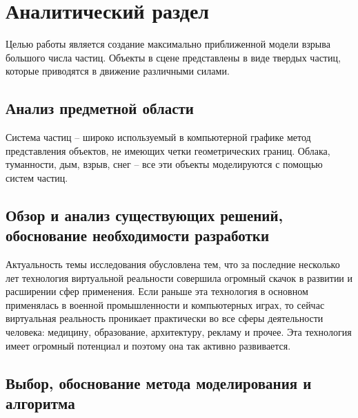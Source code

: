 \chapter{Аналитический раздел}
\hfill

Целью работы является создание максимально приближенной модели взрыва большого числа частиц. Объекты в сцене представлены в виде твердых частиц, которые приводятся в движение различными силами.  

\section{Анализ предметной области }

Система частиц – широко используемый в компьютерной графике метод представления объектов, не имеющих четки геометрических границ. Облака, туманности, дым, взрыв, снег – все эти объекты моделируются с помощью систем частиц. \cite{definition}


\section{Обзор и анализ существующих решений, обоснование необходимости разработки}

Актуальность темы исследования обусловлена тем, что за последние несколько лет технология виртуальной реальности совершила огромный скачок в развитии и расширении сфер применения. Если раньше эта технология в основном применялась в военной промышленности и компьютерных играх, то сейчас виртуальная реальность проникает практически во все сферы деятельности человека: медицину, образование, архитектуру, рекламу и прочее. Эта технология имеет огромный потенциал и поэтому она так активно развивается.

\section{Выбор, обоснование метода моделирования и алгоритма}
